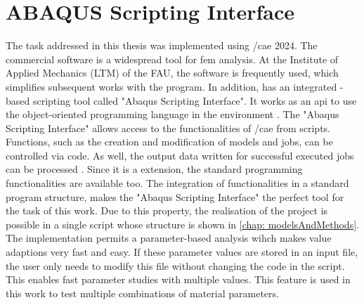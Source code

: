 \section{ABAQUS Scripting Interface} \label{sec: AbaqusBasics}

The task addressed in this thesis was implemented using /\acrshort{cae} 2024. The commercial software is a widespread tool for \acrshort{fem} analysis. At the Institute of Applied Mechanics (LTM) of the FAU, the software is frequently used, which simplifies subsequent works with the program. In addition,  has an integrated -based scripting tool called "Abaqus Scripting Interface". It works as an \acrfull{api} to use the object-oriented programming language  in the  environment \cite{dassault_systems_abaqus_2015-1}. The "Abaqus Scripting Interface" allows access to the functionalities of /\acrshort{cae} from scripts. Functions, such as the creation and modification of models and jobs, can be controlled via code. As well, the output data written for successful executed jobs can be processed \cite{dassault_systems_abaqus_2015-1}. Since it is a  extension, the standard programming functionalities are available too. The integration of  functionalities in a standard program structure, makes the "Abaqus Scripting Interface" the perfect tool for the task of this work. Due to this property, the realisation of the project is possible in a single script whose structure is shown in \autoref{chap: modelsAndMethods}. The implementation permits a parameter-based analysis wihch makes value adaptions very fast and easy. If these parameter values are stored in an input file, the user only needs to modify this file without changing the code in the script. This enables fast parameter studies with multiple values. This feature is used in this work to test multiple combinations of material parameters.  





